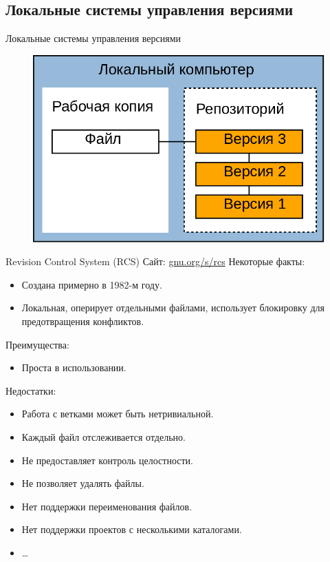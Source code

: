 \documentclass[presentation]{beamer}
\begin{document}


\subsection{Локальные системы управления версиями}

\begin{frame}{Локальные системы управления версиями}
  \begin{figure}[htb]
    \centering \includegraphics[width=1.0\textwidth]{vcs-local}
  \end{figure}
\end{frame}

\begin{frame}{Revision Control System (RCS)}
  Сайт: \url{gnu.org/s/rcs}\newline
  Некоторые факты:
  \begin{itemize}
  \item Создана примерно в 1982-м году.
  \item Локальная, оперирует отдельными файлами, использует блокировку
    для предотвращения конфликтов.
  \end{itemize}

  Преимущества:
  \begin{itemize}
  \item Проста в использовании.
  \end{itemize}

  Недостатки:
  \begin{itemize}
  \item Работа с ветками может быть нетривиальной.
  \item Каждый файл отслеживается отдельно.
  \item Не предоставляет контроль целостности.
  \item Не позволяет удалять файлы.
  \item Нет поддержки переименования файлов.
  \item Нет поддержки проектов с несколькими каталогами.
  \item \ldots{}
  \end{itemize}
\end{frame}
\end{document}
